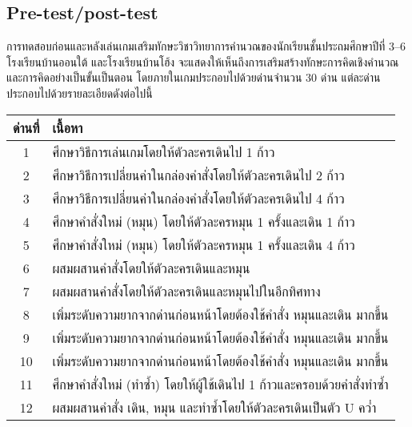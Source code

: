 \subsection{Pre-test/post-test}
การทดสอบก่อนและหลังเล่นเกมเสริมทักษะวิชาวิทยาการคำนวณของนักเรียนชั้นประถมศึกษาปีที่ 3--6 โรงเรียนบ้านออนใต้ และโรงเรียนบ้านโฮ้ง จะแสดงให้เห็นถึงการเสริมสร้างทักษะการคิดเชิงคำนวณ และการคิดอย่างเป็นขั้นเป็นตอน โดยภายในเกมประกอบไปด้วยด่านจำนวน 30 ด่าน
แต่ละด่านประกอบไปด้วยรายละเอียดดังต่อไปนี้
\begin{center}
    \begin{table}
        \begin{center}
            \begin{tabularx}{\textwidth}{|c | X|} 
             \hline
             ด่านที่ & เนื้อหา\\ [0.5ex] 
             \hline\hline
             1 &  ศึกษาวิธีการเล่นเกมโดยให้ตัวละครเดินไป 1 ก้าว \\ 
             \hline
             2 &  ศึกษาวิธีการเปลี่ยนค่าในกล่องคำสั่งโดยให้ตัวละครเดินไป 2 ก้าว \\ 
             \hline
             3 &  ศึกษาวิธีการเปลี่ยนค่าในกล่องคำสั่งโดยให้ตัวละครเดินไป 4 ก้าว \\ 
             \hline
             4 &  ศึกษาคำสั่งใหม่ (หมุน) โดยให้ตัวละครหมุน 1 ครั้งและเดิน 1 ก้าว \\ 
             \hline
             5 &  ศึกษาคำสั่งใหม่ (หมุน) โดยให้ตัวละครหมุน 1 ครั้งและเดิน 4 ก้าว \\ 
             \hline
             6 &  ผสมผสานคำสั่งโดยให้ตัวละครเดินและหมุน \\ 
             \hline
             7 &  ผสมผสานคำสั่งโดยให้ตัวละครเดินและหมุนไปในอีกทิศทาง \\ 
             \hline
             8 &  เพิ่มระดับความยากจากด่านก่อนหน้าโดยต้องใช้คำสั่ง หมุนและเดิน มากขึ้น \\ 
             \hline
             9 &  เพิ่มระดับความยากจากด่านก่อนหน้าโดยต้องใช้คำสั่ง หมุนและเดิน มากขึ้น \\ 
             \hline
             10 &  เพิ่มระดับความยากจากด่านก่อนหน้าโดยต้องใช้คำสั่ง หมุนและเดิน มากขึ้น \\ 
             \hline
             11 &  ศึกษาคำสั่งใหม่ (ทำซ้ำ) โดยให้ผู้ใช้เดินไป 1 ก้าวและครอบด้วยคำสั่งทำซ้ำ \\ 
             \hline
             12 &  ผสมผสานคำสั่ง เดิน, หมุน และทำซ้ำโดยให้ตัวละครเดินเป็นตัว U คว่ำ \\ 

\end{tabularx}
\end{center}
\end{table}
\end{center}
